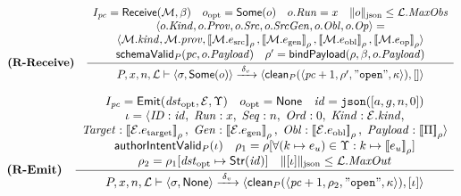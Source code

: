 \documentclass[11pt,a4paper]{article}
\theoremstyle{definition}
\theoremstyle{remark}
\newcommand{\llbracket}{\left[\!\left[}
\newcommand{\rrbracket}{\right]\!\right]}
\begin{document}
\[
\textbf{(R-Receive)} \quad
\frac{
  \begin{array}{c}
    I_{\mathit{pc}} = \mathsf{Receive}(\mathcal{M}, \beta) \quad o_{\text{opt}} = \mathsf{Some}(o) \quad o.\mathit{Run} = x \quad \|o\|_{\text{json}} \le \mathcal{L}.\mathit{MaxObs} \\
    \langle o.\mathit{Kind}, o.\mathit{Prov}, o.\mathit{Src}, o.\mathit{SrcGen}, o.\mathit{Obl}, o.\mathit{Op} \rangle = \\
    \langle \mathcal{M}.\mathit{kind}, \mathcal{M}.\mathit{prov}, \llbracket \mathcal{M}.e_{\text{src}} \rrbracket_\rho, \llbracket \mathcal{M}.e_{\text{gen}} \rrbracket_\rho, \llbracket \mathcal{M}.e_{\text{obl}} \rrbracket_\rho, \llbracket \mathcal{M}.e_{\text{op}} \rrbracket_\rho \rangle \\
    \mathsf{schemaValid}_P(\mathit{pc}, o.\mathit{Payload}) \quad \rho' = \mathsf{bindPayload}(\rho, \beta, o.\mathit{Payload})
  \end{array}
}{
  P, x, n, \mathcal{L} \vdash \langle \sigma, \mathsf{Some}(o) \rangle \xrightarrow{\;\delta_v\;} \langle \mathsf{clean}_P(\langle \mathit{pc}+1, \rho', \mathtt{"open"}, \kappa \rangle), [] \rangle
}
\]

\[
\textbf{(R-Emit)} \quad
\frac{
  \begin{array}{c}
    I_{\mathit{pc}} = \mathsf{Emit}(\mathit{dst}_{\text{opt}}, \mathcal{E}, \Upsilon) \quad o_{\text{opt}} = \mathsf{None} \quad \mathit{id} = \mathtt{json}([a, g, n, 0]) \\
    \iota = \langle \mathit{ID}: \mathit{id},\; \mathit{Run}: x,\; \mathit{Seq}: n,\; \mathit{Ord}: 0,\; \mathit{Kind}: \mathcal{E}.\mathit{kind}, \\
    \mathit{Target}: \llbracket \mathcal{E}.e_{\text{target}} \rrbracket_\rho,\; \mathit{Gen}: \llbracket \mathcal{E}.e_{\text{gen}} \rrbracket_\rho,\; \mathit{Obl}: \llbracket \mathcal{E}.e_{\text{obl}} \rrbracket_\rho,\; \mathit{Payload}: \llbracket \Pi \rrbracket_\rho \rangle \\
    \mathsf{authorIntentValid}_P(\iota) \quad \rho_1 = \rho[\forall (k \mapsto e_u) \in \Upsilon : k \mapsto \llbracket e_u \rrbracket_\rho] \\
    \rho_2 = \rho_1[\mathit{dst}_{\text{opt}} \mapsto \mathsf{Str}(\mathit{id})] \quad \|[\iota]\|_{\text{json}} \le \mathcal{L}.\mathit{MaxOut}
  \end{array}
}{
  P, x, n, \mathcal{L} \vdash \langle \sigma, \mathsf{None} \rangle \xrightarrow{\;\delta_v\;} \langle \mathsf{clean}_P(\langle \mathit{pc}+1, \rho_2, \mathtt{"open"}, \kappa \rangle), [\iota] \rangle
}
\]
\end{document}
